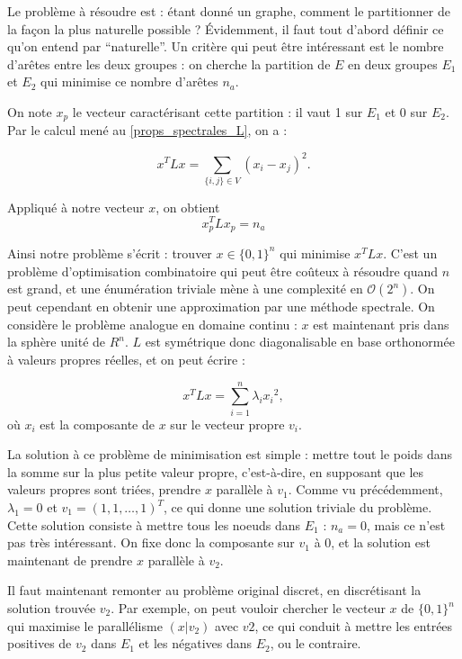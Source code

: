 \documentclass[12pt]{article}
\begin{document}
Le problème à résoudre est : étant donné un graphe, comment le
partitionner de la façon la plus naturelle possible ? Évidemment, il
faut tout d'abord définir ce qu'on entend par ``naturelle''. Un
critère qui peut être intéressant est le nombre d'arêtes entre les
deux groupes : on cherche la partition de $E$ en deux groupes $E_1$ et
$E_2$ qui minimise ce nombre d'arêtes $n_a$.

On note $x_p$ le vecteur caractérisant cette partition : il vaut 1 sur
$E_1$ et 0 sur $E_2$. Par le calcul mené au \ref{props_spectrales_L},
on a :

\begin{equation}
  x^T L x = \sum_{\{i, j\} \in V} (x_i - x_j)^2.
\end{equation}

Appliqué à notre vecteur $x$, on obtient
\begin{equation}
  x_p^T L x_p = n_a
\end{equation}

Ainsi notre problème s'écrit : trouver $x \in \{0,1\}^n$ qui
minimise $x^T L x$. C'est un problème d'optimisation combinatoire
qui peut être coûteux à résoudre quand $n$ est grand, et une
énumération triviale mène à une complexité en $\mathcal O (2^n)$. On peut
cependant en obtenir une approximation par une méthode spectrale. On
considère le problème analogue en domaine continu : $x$ est
maintenant pris dans la sphère unité de $R^n$. $L$ est symétrique donc
diagonalisable en base orthonormée à valeurs propres réelles, et on
peut écrire :

\begin{equation}
  x^T L x = \sum_{i=1}^n \lambda_i {x_i}^2,
\end{equation}
où $x_i$ est la composante de $x$ sur le vecteur propre $v_i$.

La solution à ce problème de minimisation est simple : mettre tout le
poids dans la somme sur la plus petite valeur propre, c'est-à-dire, en
supposant que les valeurs propres sont triées, prendre $x$ parallèle à
$v_1$. Comme vu précédemment, $\lambda_1 = 0$ et $v_1 = (1, 1, \dots,
1)^T$, ce qui donne une solution triviale du problème. Cette solution
consiste à mettre tous les noeuds dans $E_1$ : $n_a = 0$, mais ce
n'est pas très intéressant. On fixe donc la composante sur $v_1$ à 0,
et la solution est maintenant de prendre $x$ parallèle à $v_2$.

Il faut maintenant remonter au problème original discret, en
discrétisant la solution trouvée $v_2$. Par exemple, on peut vouloir
chercher le vecteur $x$ de $\{0,1\}^n$ qui maximise le parallélisme
$(x|v_2)$ avec $v2$, ce qui conduit à mettre les entrées positives de
$v_2$ dans $E_1$ et les négatives dans $E_2$, ou le contraire.
\end{document}
